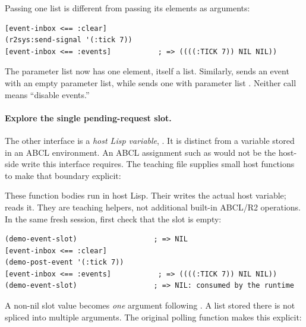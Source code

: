 Passing one list is different from passing its elements as arguments:

\begin{codeblock}
\begin{lstlisting}
[event-inbox <== :clear]
(r2sys:send-signal '(:tick 7))
[event-inbox <== :events]           ; => ((((:TICK 7)) NIL NIL))
\end{lstlisting}
\end{codeblock}

The parameter list now has one element, itself a list. Similarly,
 sends an event with an empty parameter list,
while  sends one with parameter list
. Neither call means ``disable events.''

\paragraph{Explore the single pending-request slot.}
The other interface is a \emph{host Lisp variable},
. It is distinct from a variable stored in
an ABCL environment. An ABCL assignment such as
\code{[r2sys:*signal-request* := value]} would not be the host-side
write this interface requires. The teaching file supplies small host
functions to make that boundary explicit:


These function bodies run in host Lisp. Their  writes the
actual host variable;  reads it. They are teaching
helpers, not additional built-in ABCL/R2 operations.
In the same fresh session, first check that the slot is empty:

\begin{codeblock}
\begin{lstlisting}
(demo-event-slot)                  ; => NIL
[event-inbox <== :clear]
(demo-post-event '(:tick 7))
[event-inbox <== :events]           ; => ((((:TICK 7)) NIL NIL))
(demo-event-slot)                  ; => NIL: consumed by the runtime
\end{lstlisting}
\end{codeblock}

A non-nil slot value becomes \emph{one} argument following .
A list stored there is not spliced into multiple arguments.
The original polling function makes this explicit:


